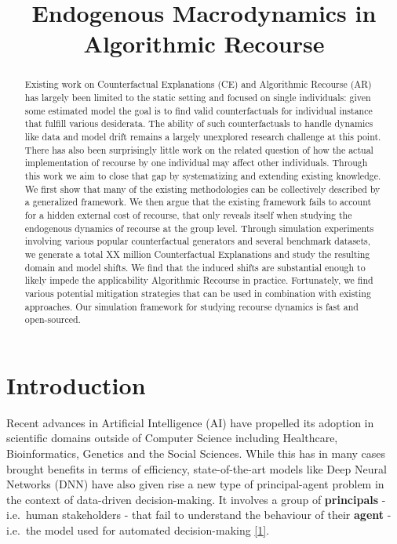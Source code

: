 \documentclass[
  conference]{IEEEtran}
\title{Endogenous Macrodynamics in Algorithmic Recourse}
\author{}
\date{}
\begin{document}
\maketitle
\begin{abstract}
Existing work on Counterfactual Explanations (CE) and Algorithmic
Recourse (AR) has largely been limited to the static setting and focused
on single individuals: given some estimated model the goal is to find
valid counterfactuals for individual instance that fulfill various
desiderata. The ability of such counterfactuals to handle dynamics like
data and model drift remains a largely unexplored research challenge at
this point. There has also been surprisingly little work on the related
question of how the actual implementation of recourse by one individual
may affect other individuals. Through this work we aim to close that gap
by systematizing and extending existing knowledge. We first show that
many of the existing methodologies can be collectively described by a
generalized framework. We then argue that the existing framework fails
to account for a hidden external cost of recourse, that only reveals
itself when studying the endogenous dynamics of recourse at the group
level. Through simulation experiments involving various popular
counterfactual generators and several benchmark datasets, we generate a
total XX million Counterfactual Explanations and study the resulting
domain and model shifts. We find that the induced shifts are substantial
enough to likely impede the applicability Algorithmic Recourse in
practice. Fortunately, we find various potential mitigation strategies
that can be used in combination with existing approaches. Our simulation
framework for studying recourse dynamics is fast and open-sourced.
\end{abstract}
\ifdefined\Shaded\renewenvironment{Shaded}{\begin{tcolorbox}[frame hidden, borderline west={3pt}{0pt}{shadecolor}, sharp corners, enhanced, interior hidden, boxrule=0pt, breakable]}{\end{tcolorbox}}\fi

\hypertarget{sec-intro}{%
\section{Introduction}\label{sec-intro}}

Recent advances in Artificial Intelligence (AI) have propelled its
adoption in scientific domains outside of Computer Science including
Healthcare, Bioinformatics, Genetics and the Social Sciences. While this
has in many cases brought benefits in terms of efficiency,
state-of-the-art models like Deep Neural Networks (DNN) have also given
rise a new type of principal-agent problem in the context of data-driven
decision-making. It involves a group of \textbf{principals} - i.e.~human
stakeholders - that fail to understand the behaviour of their
\textbf{agent} - i.e.~the model used for automated decision-making
\protect\hyperlink{ref-borch2022machine}{{[}1{]}}.
\end{document}
